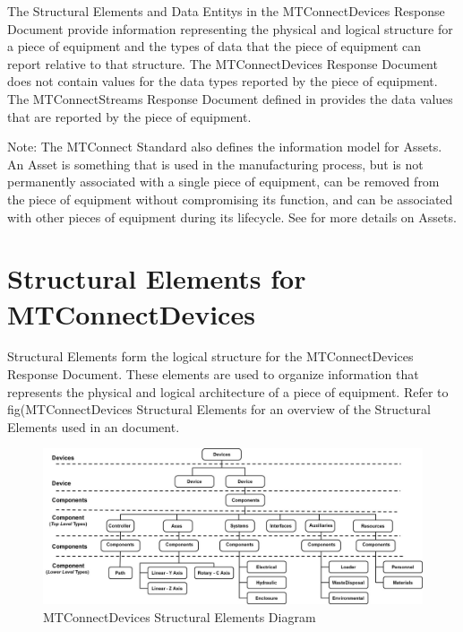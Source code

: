 The \glspl{Structural Element} and \glspl{Data Entity} in the \gls{MTConnectDevices Response Document} provide information representing the physical and logical structure for a piece of equipment and the types of data that the piece of equipment can report relative to that structure.   The \gls{MTConnectDevices Response Document} does not contain values for the data types reported by the piece of equipment.  The \gls{MTConnectStreams Response Document} defined in  provides the data values that are reported by the piece of equipment.

\begin{note}
Note:  The \gls{MTConnect Standard} also defines the information model for \glspl{Asset}.  An \gls{Asset} is something that is used in the manufacturing process, but is not permanently associated with a single piece of equipment, can be removed from the piece of equipment without compromising its function, and can be associated with other pieces of equipment during its lifecycle.  See  for more details on \glspl{Asset}.

\end{note}

\section{Structural Elements for MTConnectDevices}
\label{sec:Structural Elements for MTConnectDevices}

\glspl{Structural Element} form the logical structure for the \gls{MTConnectDevices Response Document}.  These elements are used to organize information that represents the physical and logical architecture of a piece of equipment.  Refer to {{fig(MTConnectDevices Structural Elements}} for an overview of the \glspl{Structural Element} used in an  document.

\begin{figure}[ht]
  \centering
    \includegraphics[width=1.0\textwidth]{figures/MTConnectDevices Structural Elements.png}
  \caption{MTConnectDevices Structural Elements Diagram}
  \label{fig:MTConnectDevices Structural Elements}
\end{figure}

